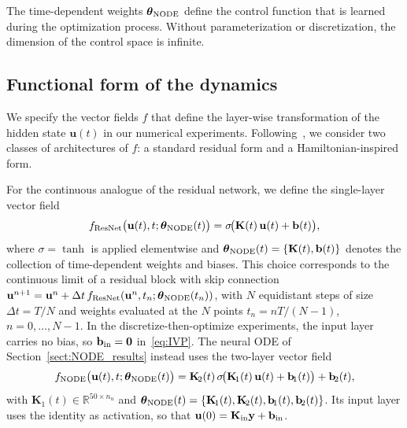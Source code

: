 \documentclass[pdflatex,sn-mathphys-num]{sn-jnl}%
\newcommand{\R}{\mathbb{R}}
\newcommand{\bfu}{\mathbf{u}}
\newcommand{\bfy}{\mathbf{y}}
\newcommand{\bfb}{\mathbf{b}}
\newcommand{\bfK}{\mathbf{K}}
\newcommand{\bftheta}{\boldsymbol{\theta}}
\theoremstyle{thmstyleone}%
\theoremstyle{thmstyletwo}%
\theoremstyle{thmstylethree}%
\begin{document}
The time-dependent weights $\bftheta_{\rm NODE}$ define the control function that is learned during the optimization process.
%
Without parameterization or discretization, the dimension of the control space  is infinite.
%
 



\subsection{Functional form of the dynamics}\label{explicit form}
We specify the vector fields $f$ that define the layer-wise transformation of the hidden state $\bfu(t)$ in our numerical experiments.
%
Following~\cite{ChenEtAl2018,HaberRuthotto2017}, we consider two classes of architectures of $f$: a standard residual form and a Hamiltonian-inspired form.

For the continuous analogue of the residual network, we define the single-layer vector field
\begin{equation}\label{eq:f_resnet}
    f_{\text{ResNet}}\big(\bfu(t), t; \bftheta_{\rm NODE}(t)\big)
    = \sigma\!\big(\bfK(t)\,\bfu(t) + \bfb(t)\big),
\end{equation}
where $\sigma = \tanh$ is applied elementwise
and $\bftheta_{\rm NODE}(t) = \{\bfK(t), \bfb(t)\}$ denotes the collection of time-dependent weights and biases.
%
This choice corresponds to the continuous limit of a residual block with skip connection
$\bfu^{n+1} = \bfu^n + \Delta t\,f_{\text{ResNet}}(\bfu^n,t_n;\bftheta_{\rm NODE}(t_n))$, with $N$ equidistant steps of size $\Delta t = T/N$ and weights evaluated at the $N$ points $t_n = nT/(N-1)$, $n=0,\ldots,N-1$.
%
In the discretize-then-optimize experiments, the input layer carries no bias, so $\bfb_{\rm in} = \mathbf{0}$ in~\eqref{eq:IVP}.
%
The neural ODE of Section~\ref{sect:NODE_results} instead uses the two-layer vector field
\begin{equation}\label{eq:f_node}
    f_{\text{NODE}}\big(\bfu(t), t; \bftheta_{\rm NODE}(t)\big)
    = \bfK_{\!2}(t)\,\sigma\!\big(\bfK_{\!1}(t)\,\bfu(t) + \bfb_{\!1}(t)\big) + \bfb_{\!2}(t),
\end{equation}
with $\bfK_{\!1}(t)\in\R^{50\times n_u}$ and $\bftheta_{\rm NODE}(t) = \{\bfK_{\!1}(t), \bfK_{\!2}(t), \bfb_{\!1}(t), \bfb_{\!2}(t)\}$.
%
Its input layer uses the identity as activation, so that $\bfu(0) = \bfK_{\rm in}\bfy + \bfb_{\rm in}$.
\end{document}

